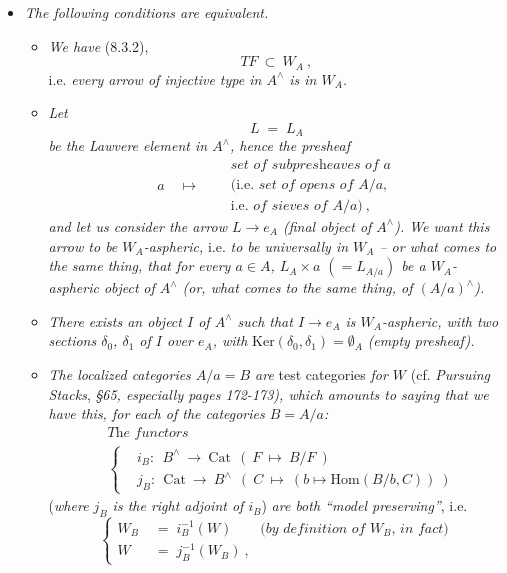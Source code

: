 \documentclass[11pt]{article}
\newcommand{\msp}[1]{\marginpar{\footnotesize [#1]}}
\newcommand{\Cat}{\mathrm{Cat}}
\newcommand{\chap}{^{\wedge}}
\begin{document}
\begin{itemize}[leftmargin=*]
\item[1$^\circ$)] \textit{The following conditions are equivalent.}
\begin{itemize}[leftmargin=*]
\item[a)] \textit{We have} (8.3.2),
\[
TF\ \subset\ W_A\ ,
\]
i.e. \textit{every arrow of injective type in $A\chap$ is in $W_A$.}
\item[b)] \textit{Let}
\[
L \;=\; L_A
\tag*{(8.4.1)}
\]
\textit{be the Lawvere element in $A\chap$, hence the presheaf}
\[
a \quad\longmapsto\quad
\begin{aligned}
&\textit{set of subpresheaves of $a$}\\
&(\text{i.e. }\textit{set of opens of $A/a$},\\
&\text{i.e. }\textit{of sieves of $A/a$})\ ,
\end{aligned}
\]
\textit{and let us consider the arrow $L\longrightarrow e_A$ (final object of $A\chap$). We want this arrow to be $W_A$-aspheric,} i.e. \textit{to be universally in $W_A$ -- or what comes to the same thing, that for every $a\in A$, $L_A\times a$ $(=L_{A/a})$ be a $W_A$-aspheric object}
\msp{page 106}
\textit{of $A\chap$ (or, what comes to the same thing, of $(A/a)\chap$).}
\item[c)] \textit{There exists an object $I$ of $A\chap$ such that $I\longrightarrow e_A$ is $W_A$-aspheric, with two sections $\delta_0$, $\delta_1$ of $I$ over $e_A$, with} $\mathrm{Ker}(\delta_0,\delta_1)=\emptyset_A$ \textit{(empty presheaf).}
\item[d)] \textit{The localized categories $A/a=B$ are} test categories \textit{for $W$} (cf. \textit{Pursuing Stacks}, \textit{§65, especially pages 172-173), which amounts to saying that we have this, for each of the categories $B=A/a$:}
\[
\begin{aligned}
&\textit{The functors}\\
&\left\{
\begin{aligned}
&i_B:\ \ B\chap \ \longrightarrow\ \Cat\ \ (\ F\ \longmapsto\ B/F\ )\\
&j_B:\ \ \Cat\ \longrightarrow\ B\chap\ \ (\ C\ \longmapsto\ (b\longmapsto \mathrm{Hom}(B/b,C))\ )
\end{aligned}
\right.
\end{aligned}
\tag*{(8.4.2)}
\]
(\textit{where $j_B$ is the right adjoint of $i_B$}) \textit{are both ``model preserving''}, i.e.
\[
\left\{
\begin{aligned}
W_B \;&=\; i_B^{-1}(W) \qquad \textit{(by definition of $W_B$, in fact)}\\
W \;&=\; j_B^{-1}(W_B)\ ,
\end{aligned}
\right.
\tag*{(8.4.3)}
\]
\end{itemize}
\end{itemize}
\end{document}
